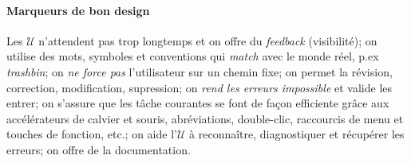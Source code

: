 \documentclass{report}
\begin{document}
\begin{multicols*}{3}
    \paragraph{Marqueurs de bon design}
    Les $\mathcal{U}$ n'attendent pas trop longtemps et on offre 
    du \textit{feedback} (visibilité); on utilise des mots, symboles
    et conventions
    qui \textit{match} avec le monde réel, p.ex \textit{trashbin}; 
    on \textit{ne force pas} l'utilisateur sur un chemin fixe; 
    on permet la révision, correction, modification, supression; 
    on \textit{rend les erreurs impossible} et valide les entrer; on s'assure 
    que les tâche courantes se font de façon efficiente grâce aux 
    accélérateurs de calvier et souris, abréviations, double-clic, raccourcis 
    de menu et touches de fonction, etc.; on aide  
    l'$\mathcal{U}$ à reconnaître, diagnostiquer et récupérer 
    les erreurs; on offre de la documentation.



    



    










    
    

    \end{multicols*}




 
\end{document}
